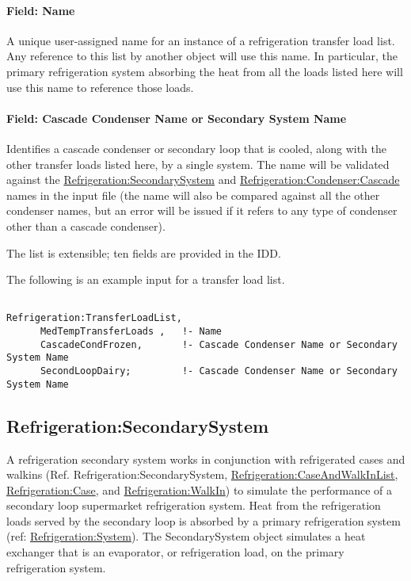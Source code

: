 \paragraph{Field: Name}\label{field-name-14-007}

A unique user-assigned name for an instance of a refrigeration transfer load list. Any reference to this list by another object will use this name. In particular, the primary refrigeration system absorbing the heat from all the loads listed here will use this name to reference those loads.

\paragraph{Field: Cascade Condenser Name or Secondary System Name}\label{field-cascade-condenser-name-or-secondary-system-name}

Identifies a cascade condenser or secondary loop that is cooled, along with the other transfer loads listed here, by a single system. The name will be validated against the \hyperref[refrigerationsecondarysystem]{Refrigeration:SecondarySystem} and \hyperref[refrigerationcondensercascade]{Refrigeration:Condenser:Cascade} names in the input file (the name will also be compared against all the other condenser names, but an error will be issued if it refers to any type of condenser other than a cascade condenser).

The list is extensible; ten fields are provided in the IDD.

The following is an example input for a transfer load list.

\begin{lstlisting}

Refrigeration:TransferLoadList,
      MedTempTransferLoads ,   !- Name
      CascadeCondFrozen,       !- Cascade Condenser Name or Secondary System Name
      SecondLoopDairy;         !- Cascade Condenser Name or Secondary System Name
\end{lstlisting}

\subsection{Refrigeration:SecondarySystem}\label{refrigerationsecondarysystem}

A refrigeration secondary system works in conjunction with refrigerated cases and walkins (Ref. Refrigeration:SecondarySystem, \hyperref[refrigerationcaseandwalkinlist]{Refrigeration:CaseAndWalkInList}, \hyperref[refrigerationcase]{Refrigeration:Case}, and \hyperref[refrigerationwalkin]{Refrigeration:WalkIn}) to simulate the performance of a secondary loop supermarket refrigeration system. Heat from the refrigeration loads served by the secondary loop is absorbed by a primary refrigeration system (ref: \hyperref[refrigerationsystem]{Refrigeration:System}). The SecondarySystem object simulates a heat exchanger that is an evaporator, or refrigeration load, on the primary refrigeration system.

